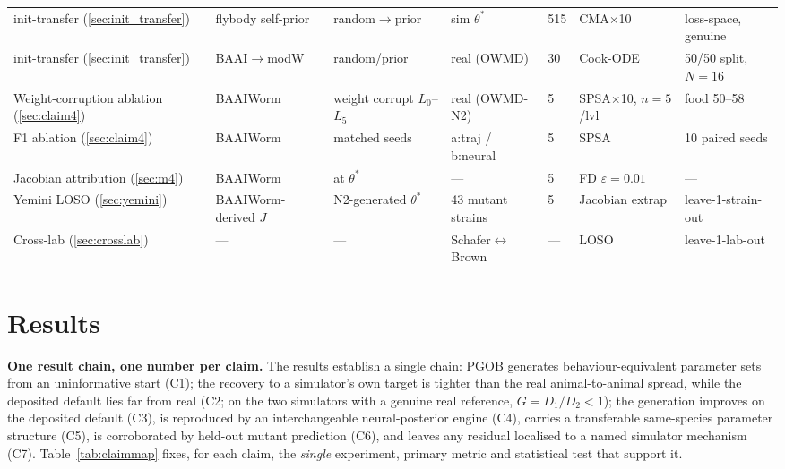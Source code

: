 \documentclass[11pt]{article}
\begin{document}
\begin{table}[H]
{\begin{tabular}{lllllll}
init-transfer (\ref{sec:init_transfer}) & flybody self-prior & random$\to$prior & sim $\theta^{*}$ & 515 & CMA$\times$10 & loss-space, genuine \\
init-transfer (\ref{sec:init_transfer}) & BAAI$\to$modW & random/prior & real (OWMD) & 30 & Cook-ODE & 50/50 split, $N{=}16$ \\
Weight-corruption ablation (\ref{sec:claim4}) & BAAIWorm & weight corrupt $L_0$--$L_5$ & real (OWMD-N2) & 5 & SPSA$\times$10, $n{=}5$/lvl & food 50--58 \\
F1 ablation (\ref{sec:claim4}) & BAAIWorm & matched seeds & a:traj / b:neural & 5 & SPSA & 10 paired seeds \\
Jacobian attribution (\ref{sec:m4}) & BAAIWorm & at $\theta^{*}$ & --- & 5 & FD $\varepsilon{=}0.01$ & --- \\
Yemini LOSO (\ref{sec:yemini}) & BAAIWorm-derived $J$ & N2-generated $\theta^{*}$ & 43 mutant strains & 5 & Jacobian extrap & leave-1-strain-out \\
Cross-lab (\ref{sec:crosslab}) & --- & --- & Schafer$\leftrightarrow$Brown & --- & LOSO & leave-1-lab-out \\\bottomrule
\end{tabular}%
}
\end{table}

\section{Results}
\label{sec:results_main}

\textbf{One result chain, one number per claim.} The results establish a single chain: PGOB generates behaviour-equivalent parameter sets from an uninformative start (C1); the recovery to a simulator's own target is tighter than the real animal-to-animal spread, while the deposited default lies far from real (C2; on the two simulators with a genuine real reference, $G{=}D_1/D_2{<}1$); the generation improves on the deposited default (C3), is reproduced by an interchangeable neural-posterior engine (C4), carries a transferable same-species parameter structure (C5), is corroborated by held-out mutant prediction (C6), and leaves any residual localised to a named simulator mechanism (C7). Table~\ref{tab:claimmap} fixes, for each claim, the \emph{single} experiment, primary metric and statistical test that support it.
\end{document}
